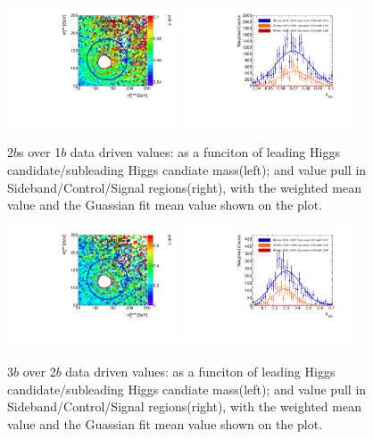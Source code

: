 \begin{figure}[htbp!]
\begin{center}
\includegraphics[angle=270, width=0.45\textwidth]{./figures/boosted/AppendixMuqcdstudy/TwoTag_split_Incl_mH0H1.pdf}
\includegraphics[angle=270, width=0.45\textwidth]{./figures/boosted/AppendixMuqcdstudy/TwoTag_split_Incl_mH0H1_pull.pdf}
\caption{2$b$s over 1$b$ data driven \muqcd values: \muqcd as a funciton of leading Higgs candidate/subleading Higgs candiate mass(left); and \muqcd value pull in Sideband/Control/Signal regions(right), with the weighted mean value and the Guassian fit mean value shown on the plot.}
\label{fig:app-muqcd-2bs}
\end{center}
\end{figure}

\begin{figure}[htbp!]
\begin{center}
\includegraphics[angle=270, width=0.45\textwidth]{./figures/boosted/AppendixMuqcdstudy/ThreeTag_Incl_mH0H1.pdf}
\includegraphics[angle=270, width=0.45\textwidth]{./figures/boosted/AppendixMuqcdstudy/ThreeTag_Incl_mH0H1_pull.pdf}
\caption{3$b$ over 2$b$ data driven \muqcd values: \muqcd as a funciton of leading Higgs candidate/subleading Higgs candiate mass(left); and \muqcd value pull in Sideband/Control/Signal regions(right), with the weighted mean value and the Guassian fit mean value shown on the plot.}
\label{fig:app-muqcd-3b}
\end{center}
\end{figure}

